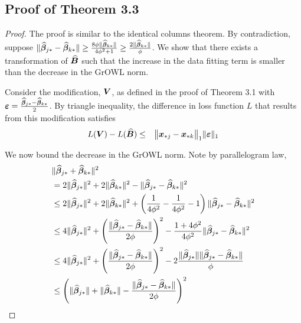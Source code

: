 \subsection*{Proof of Theorem 3.3}
\begin{proof}
The proof is similar to the identical columns theorem. By contradiction, suppose
$\|\widehat {\boldsymbol{\beta}}_{j {\ast}} - \widehat {\boldsymbol{\beta}}_{k {\ast}}\| \geq \frac{8\phi \|\widehat {\boldsymbol{\beta}}_{k
    {\ast}}\|}{4\phi^2+1}  \geq \frac{2 \|\widehat {\boldsymbol{\beta}}_{k {\ast}}\|}{\phi}$. We show that there
exists a transformation of $\widehat{\boldsymbol{B}}$ such that the increase in the data fitting term
is smaller than the decrease in the GrOWL norm.

Consider the modification, $\boldsymbol{V}$, as defined in the proof of Theorem 3.1 with $\boldsymbol{\varepsilon} =
\frac{\widehat {\boldsymbol{\beta}}_{j {\ast}} - \widehat {\boldsymbol{\beta}}_{k {\ast}}}{2}$. By triangle inequality, the
difference in loss function $L$ that results from this modification satisfies
\begin{eqnarray*}
L(\bm V) - L(\widehat{\bm B})  & \leq  & \bigl\|{\bm x}_{{\ast} j}- {\bm x}_{{\ast} k}\bigr\|_1  \|\boldsymbol{\varepsilon} \|_1  
\end{eqnarray*}

We now bound the decrease in the GrOWL norm. Note by parallelogram law, 
\begin{align*}
 & \|\widehat {\boldsymbol{\beta}}_{j {\ast}} + \widehat {\boldsymbol{\beta}}_{k {\ast}}\|^2 \\
 & = 2\|\widehat {\boldsymbol{\beta}}_{j {\ast}}\|^2 + 2\| \widehat {\boldsymbol{\beta}}_{k {\ast}}\|^2 -  \|\widehat {\boldsymbol{\beta}}_{j {\ast}} - \widehat {\boldsymbol{\beta}}_{k {\ast}} \|^2\\
 & \leq 2\|\widehat {\boldsymbol{\beta}}_{j {\ast}}\|^2 + 2\| \widehat {\boldsymbol{\beta}}_{k {\ast}}\|^2 + \left( \frac{1}{4\phi^2} - \frac{1}{4\phi^2} -1 \right) \|\widehat {\boldsymbol{\beta}}_{j {\ast}} - \widehat {\boldsymbol{\beta}}_{k {\ast}} \|^2 \\
 & \leq 4\|\widehat {\boldsymbol{\beta}}_{j {\ast}}\|^2 + \left(  \frac{ \|\widehat {\boldsymbol{\beta}}_{j {\ast}} - \widehat {\boldsymbol{\beta}}_{k {\ast}} \|}{2\phi} \right)^2  - \frac{1 + 4\phi^2}{4\phi^2} \|\widehat {\boldsymbol{\beta}}_{j {\ast}} - \widehat {\boldsymbol{\beta}}_{k {\ast}} \|^2\\
 & \leq 4\|\widehat {\boldsymbol{\beta}}_{j {\ast}}\|^2 + \left(  \frac{ \|\widehat {\boldsymbol{\beta}}_{j {\ast}} - \widehat {\boldsymbol{\beta}}_{k {\ast}} \|}{2\phi} \right)^2 -  2  \frac{ \|\widehat {\boldsymbol{\beta}}_{j {\ast}}\| \|\widehat {\boldsymbol{\beta}}_{j {\ast}} - \widehat {\boldsymbol{\beta}}_{k {\ast}} \|}{\phi} \\
 & \leq \left( \|\widehat {\boldsymbol{\beta}}_{j {\ast}}\| + \| \widehat {\boldsymbol{\beta}}_{k {\ast}}\| -  \frac{ \|\widehat {\boldsymbol{\beta}}_{j {\ast}} - \widehat {\boldsymbol{\beta}}_{k {\ast}} \|}{2\phi} \right)^2
 \end{align*}
 

\end{proof}
